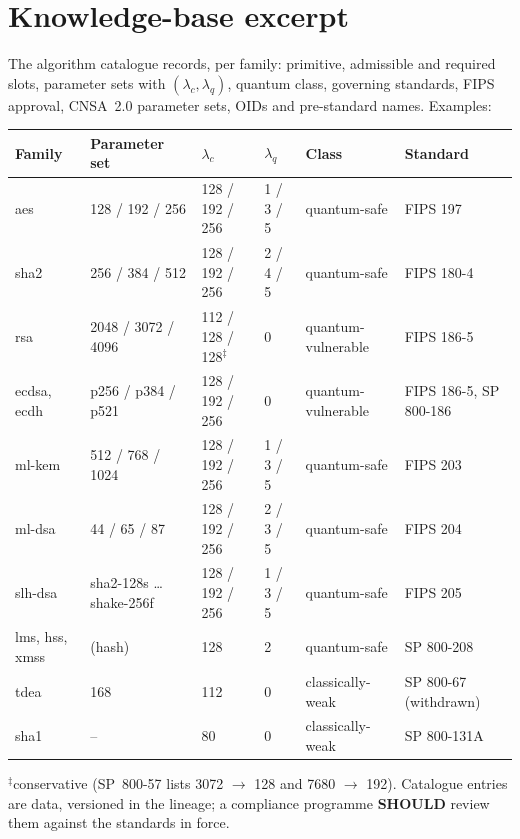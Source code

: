 \documentclass[11pt,a4paper]{article}
\newcommand{\SHOULD}{\textbf{SHOULD}}
\theoremstyle{definition}
\theoremstyle{plain}
\begin{document}
\section{Knowledge-base excerpt}
The algorithm catalogue records, per family: primitive, admissible and required slots, parameter
sets with $(\lambda_c,\lambda_q)$, quantum class, governing standards, FIPS approval, CNSA~2.0
parameter sets, OIDs and pre-standard names. Examples:
\begin{center}\footnotesize
\begin{tabularx}{\textwidth}{lXlllX}
\toprule
Family & Parameter set & $\lambda_c$ & $\lambda_q$ & Class & Standard\\
\midrule
aes & 128 / 192 / 256 & 128 / 192 / 256 & 1 / 3 / 5 & quantum-safe & FIPS 197\\
sha2 & 256 / 384 / 512 & 128 / 192 / 256 & 2 / 4 / 5 & quantum-safe & FIPS 180-4\\
rsa & 2048 / 3072 / 4096 & 112 / 128 / 128$^{\ddagger}$ & 0 & quantum-vulnerable & FIPS 186-5\\
ecdsa, ecdh & p256 / p384 / p521 & 128 / 192 / 256 & 0 & quantum-vulnerable & FIPS 186-5, SP 800-186\\
ml-kem & 512 / 768 / 1024 & 128 / 192 / 256 & 1 / 3 / 5 & quantum-safe & FIPS 203\\
ml-dsa & 44 / 65 / 87 & 128 / 192 / 256 & 2 / 3 / 5 & quantum-safe & FIPS 204\\
slh-dsa & sha2-128s \ldots{} shake-256f & 128 / 192 / 256 & 1 / 3 / 5 & quantum-safe & FIPS 205\\
lms, hss, xmss & (hash) & 128 & 2 & quantum-safe & SP 800-208\\
tdea & 168 & 112 & 0 & classically-weak & SP 800-67 (withdrawn)\\
sha1 & -- & 80 & 0 & classically-weak & SP 800-131A\\
\bottomrule
\end{tabularx}
\end{center}
$^{\ddagger}$conservative (SP~800-57 lists 3072 $\to$ 128 and 7680 $\to$ 192). Catalogue entries are
data, versioned in the lineage; a compliance programme \SHOULD{} review them against the
standards in force.
\end{document}
